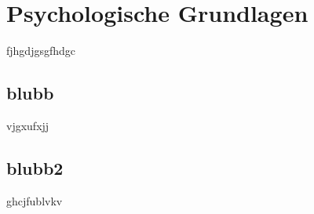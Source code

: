 \section{Psychologische Grundlagen}\label{sec:psychologische_grundlagen}
fjhgdjgsgfhdgc


\subsection{blubb}
vjgxufxjj


\subsection{blubb2}
ghcjfublvkv